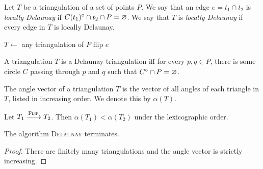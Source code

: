 \begin{center}
\end{center}

\begin{definition}
    Let $T$ be a triangulation of a set of points $P$.
    We say that an edge $e = t_1 \cap t_2$ is \emph{locally Delaunay} if
    $C(t_1)^\circ \cap t_2 \cap P = \varnothing$.
    We say that $T$ is \emph{locally Delaunay} if every edge in $T$
    is locally Delaunay.
\end{definition}

\begin{algo}
        \State $T \gets$ any triangulation of $P$
            \State flip $e$
        \EndWhile
    \EndFn
\end{algo}

\begin{proposition} \label{thm:delaunay:edge}
    A triangulation $T$ is a Delaunay triangulation iff for every
    $p, q \in P$, there is some circle $C$ passing through $p$ and $q$ such
    that $C^\circ \cap P = \varnothing$.
\end{proposition}

\begin{definition} \label{def:angle-vector}
    The angle vector of a triangulation $T$ is the vector of all angles of
    each triangle in $T$, listed in increasing order.
    We denote this by $\alpha(T)$.
\end{definition}
\begin{proposition} \label{thm:delaunay:angle-vector}
    Let $T_1 \xrightarrow{\textsc{Flip}} T_2$.
    Then $\alpha(T_1) < \alpha(T_2)$ under the lexicographic order.
\end{proposition}

\begin{corollary} \label{thm:delaunay:term}
    The algorithm \textsc{Delaunay} terminates.
\end{corollary}
\begin{proof}
    There are finitely many triangulations and the angle vector is strictly
    increasing.
\end{proof}

